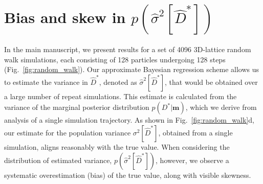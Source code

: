 \documentclass[reprint,superscriptaddress,nobibnotes,amsmath,amssymb,aps,prx,hidelinks,linenumbers]{revtex4-2}
\newcommand{\model}{\bm{m}}
\newcommand{\prob}[1]{\ensuremath{p(#1)}}
\newcommand{\Dest}{\ensuremath{\widehat{D}^*}}
\newcommand{\D}{\ensuremath{D^*}}
\newcommand{\var}[1]{\ensuremath{\sigma^2[#1]}}
\newcommand{\varest}[1]{\ensuremath{\widehat{\sigma}^2[#1]}}
\begin{document}
\section{Bias and skew in $\prob{\varest{\Dest}}$}
\label{sec:skew}
In the main manuscript, we present results for a set of \num{4096} 3D-lattice random walk simulations, each consisting of \num{128} particles undergoing \num{128} steps (Fig.~\ref{fig:random_walk}).
Our approximate Bayesian regression scheme allows us to estimate the variance in $\Dest$, denoted as $\varest{\Dest}$, that would be obtained over a large number of repeat simulations.
This estimate is calculated from the variance of the marginal posterior distribution $\prob{\D|\model}$, which we derive from analysis of a single simulation trajectory.
As shown in Fig.~\ref{fig:random_walk}d, our estimate for the population variance $\var{\Dest}$, obtained from a single simulation, aligns reasonably with the true value.
When considering the distribution of estimated variance, $\prob{\varest{\Dest}}$, however, we observe a systematic overestimation (bias) of the true value, along with visible skewness.
\end{document}
